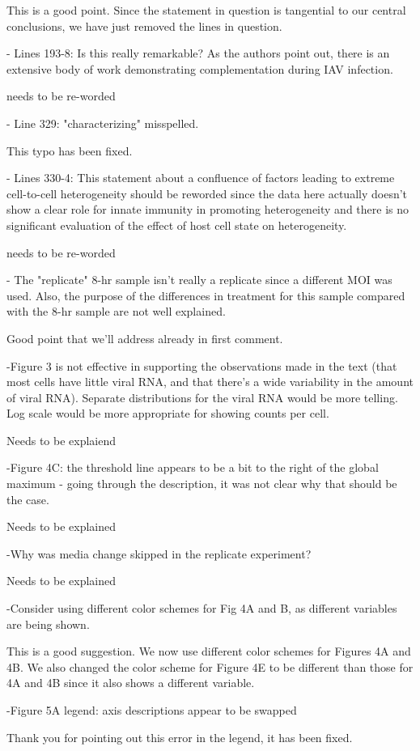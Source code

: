 \documentclass[11pt, oneside]{article}   	%
\begin{document}
{\color{black}
This is a good point. 
Since the statement in question is tangential to our central conclusions, we have just removed the lines in question.
}

- Lines 193-8: Is this really remarkable? As the authors point out, there is an extensive body of work demonstrating complementation during IAV infection. 

{\color{red} needs to be re-worded}

- Line 329: "characterizing" misspelled. 

{\color{black}
This typo has been fixed.
}

- Lines 330-4: This statement about a confluence of factors leading to extreme cell-to-cell heterogeneity should be reworded since the data here actually doesn't show a clear role for innate immunity in promoting heterogeneity and there is no significant evaluation of the effect of host cell state on heterogeneity. 

{\color{red} needs to be re-worded}

- The "replicate" 8-hr sample isn't really a replicate since a different MOI was used. Also, the purpose of the differences in treatment for this sample compared with the 8-hr sample are not well explained. 

{\color{red}
Good point that we'll address already in first comment.}

-Figure 3 is not effective in supporting the observations made in the text (that most cells have little viral RNA, and that there's a wide variability in the amount of viral RNA). Separate distributions for the viral RNA would be more telling. Log scale would be more appropriate for showing counts per cell. 

{\color{red} Needs to be explaiend}

-Figure 4C: the threshold line appears to be a bit to the right of the global maximum - going through the description, it was not clear why that should be the case. 

{\color{red} Needs to be explained}

-Why was media change skipped in the replicate experiment? 

{\color{red} Needs to be explained}

-Consider using different color schemes for Fig 4A and B, as different variables are being shown. 

{\color{black} 
This is a good suggestion.
We now use different color schemes for Figures 4A and 4B.
We also changed the color scheme for Figure 4E to be different than those for 4A and 4B since it also shows a different variable.}

-Figure 5A legend: axis descriptions appear to be swapped

{\color{black}
Thank you for pointing out this error in the legend, it has been fixed.
}
\end{document}
